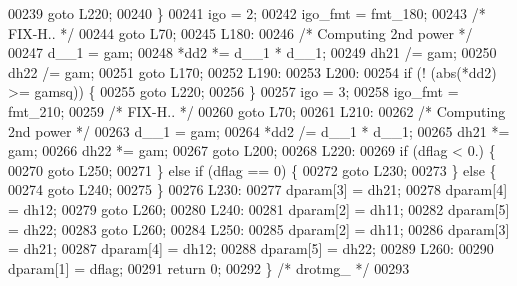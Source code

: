 \begin{DoxyCode}
00239     \textcolor{keywordflow}{goto} L220;
00240     \}
00241     igo = 2;
00242     igo\_fmt = fmt\_180;
00243 \textcolor{comment}{/*              FIX-H.. */}
00244     \textcolor{keywordflow}{goto} L70;
00245 L180:
00246 \textcolor{comment}{/* Computing 2nd power */}
00247     d\_\_1 = gam;
00248     *dd2 *= d\_\_1 * d\_\_1;
00249     dh21 /= gam;
00250     dh22 /= gam;
00251     \textcolor{keywordflow}{goto} L170;
00252 L190:
00253 L200:
00254     \textcolor{keywordflow}{if} (! (abs(*dd2) >= gamsq)) \{
00255     \textcolor{keywordflow}{goto} L220;
00256     \}
00257     igo = 3;
00258     igo\_fmt = fmt\_210;
00259 \textcolor{comment}{/*              FIX-H.. */}
00260     \textcolor{keywordflow}{goto} L70;
00261 L210:
00262 \textcolor{comment}{/* Computing 2nd power */}
00263     d\_\_1 = gam;
00264     *dd2 /= d\_\_1 * d\_\_1;
00265     dh21 *= gam;
00266     dh22 *= gam;
00267     \textcolor{keywordflow}{goto} L200;
00268 L220:
00269     \textcolor{keywordflow}{if} (dflag < 0.) \{
00270     \textcolor{keywordflow}{goto} L250;
00271     \} \textcolor{keywordflow}{else} \textcolor{keywordflow}{if} (dflag == 0) \{
00272     \textcolor{keywordflow}{goto} L230;
00273     \} \textcolor{keywordflow}{else} \{
00274     \textcolor{keywordflow}{goto} L240;
00275     \}
00276 L230:
00277     dparam[3] = dh21;
00278     dparam[4] = dh12;
00279     \textcolor{keywordflow}{goto} L260;
00280 L240:
00281     dparam[2] = dh11;
00282     dparam[5] = dh22;
00283     \textcolor{keywordflow}{goto} L260;
00284 L250:
00285     dparam[2] = dh11;
00286     dparam[3] = dh21;
00287     dparam[4] = dh12;
00288     dparam[5] = dh22;
00289 L260:
00290     dparam[1] = dflag;
00291     \textcolor{keywordflow}{return} 0;
00292 \} \textcolor{comment}{/* drotmg\_ */}
00293 
\end{DoxyCode}
